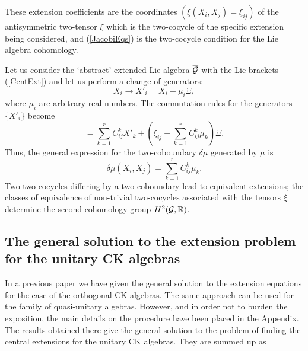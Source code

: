 \documentclass[12pt]{article}
\begin{document}
These  extension coefficients  are the coordinates
$({\xi}(X_i,X_j)={\xi}_{ij})$ of the antisymmetric
two-tensor ${\xi}$ which is the two-cocycle of the specific extension
being considered, and  (\ref{JacobiEqs}) is
the two-cocycle condition for the Lie algebra cohomology.

Let us consider  the `abstract' extended Lie algebra $\overline{{\cal G}}$
with the  Lie brackets (\ref{CentExt}) and let us perform a change of
generators:
\begin{equation}
X_i\to X'_i=X_i+\mu_i\Xi,
\label{ChangeGens}
\end{equation}
where $\mu_i$ are arbitrary real
numbers. The commutation rules
for the generators $\{X'_i\}$ become
\begin{equation}
[X'_i,X'_j]=\sum_{k=1}^r
C_{ij}^k X'_k  + ({\xi}_{ij} -\sum_{k=1}^r C_{ij}^k \mu_k )\Xi .
\label{ChangeGensCR}
\end{equation}
Thus, the general expression for the two-coboundary $\delta\mu$
generated  by $\mu$ is
\begin{equation}
\delta\mu(X_i, X_j) = \sum_{k=1}^r C_{ij}^k
\mu_{k}  .
\label{Cobound}
\end{equation}
Two two-cocycles differing by a two-coboundary lead to equivalent
extensions; the classes of equivalence of non-trivial two-cocycles
associated with the tensors ${\xi}$ determine the second cohomology group
$H^2({{\cal G}},{{\mathbb R}})$.

\subsection{The  general solution to the extension problem for the
 unitary CK algebras}

In a previous paper \cite{Azc.Her.Bue.San:96}
we have given the general solution to
the extension equations for the case of the  orthogonal CK algebras.
The same approach can be used for the   family of
quasi-unitary algebras. However, and in order not to burden the
exposition, the main details on the procedure have been placed in the Appendix.
The results obtained there give the  general solution to the problem of
finding the central extensions for the unitary CK
algebras. They are summed up as
\end{document}
